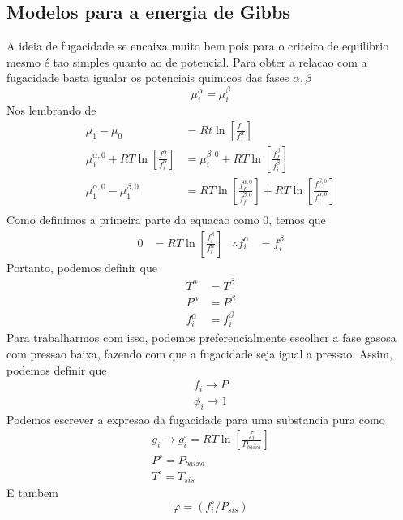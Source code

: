 \subsection{Modelos para a energia de Gibbs}
A ideia de fugacidade se encaixa muito bem pois para o criteiro de equilibrio mesmo é tao simples quanto ao de potencial.
Para obter a relacao com a fugacidade basta igualar os potenciais quimicos das fases \(\alpha, \beta\)
\begin{equation}
    \mu_i^\alpha = \mu_i^\beta
\end{equation}
Nos lembrando de
\begin{align}
    \mu_1 - \mu_0 &= Rt \ln \left[\frac{f_1}{f_1^\alpha}\right]\\
    \mu_1^{\alpha,0} +RT \ln \left[ \frac{f_f^{\alpha}}{f_i^{\alpha}} \right] &= \mu_i^{\beta,0} + RT \ln \left[ \frac{f_f^\beta}{f_i^{\beta}}\right]\\
    \mu_1^{\alpha,0} - \mu_1^{\beta,0} &= RT \ln \left[ \frac{f_f^{\alpha,0}}{f_f^{\beta,0}} \right] + RT \ln \left[ \frac{f_i^{\beta,0}}{f_i^{\alpha,0}}\right]\\
\end{align}
Como definimos a primeira parte da equacao como 0, temos que
\begin{align}
    0 &= RT \ln \left[ \frac{f_i^\beta}{f_i^\alpha} \right]
    &\therefore
    f_i^\alpha &= f_i^\beta
\end{align}
Portanto, podemos definir que 
\begin{align}
    T^\alpha &= T^\beta\\
    P^\alpha &= P^\beta\\
    f_i^\alpha &= f_i^\beta
\end{align}
Para trabalharmos com isso, podemos  preferencialmente escolher a fase gasosa com pressao baixa,
fazendo com que a fugacidade seja igual a pressao. Assim, podemos definir que
\begin{align}
    f_i \to P\\
    \phi_i \to 1
\end{align}
Podemos escrever a expresao da fugacidade para uma substancia pura como
\begin{align}
    g_i \to g_i^\circ = RT \ln \left[\frac{f_i^\circ}{P_{baixa}} \right]\\
    P^\circ = P_{baixa}\\
    T^\circ = T_{sis}
\end{align}
E tambem
\begin{equation}
    \varphi = (f_i^\circ / P_{sis})
\end{equation}
